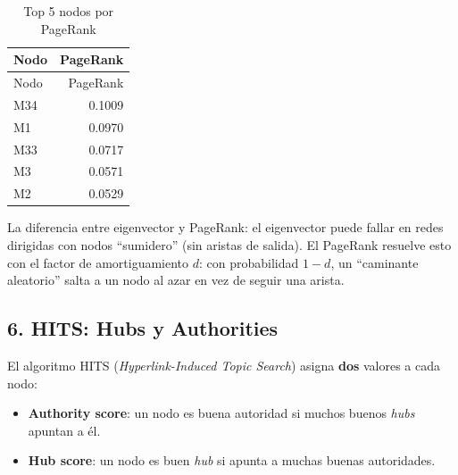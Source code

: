 \documentclass[
  letterpaper,
  DIV=11,
  numbers=noendperiod]{scrreprt}
\providecommand{\tightlist}{%
  \setlength{\itemsep}{0pt}\setlength{\parskip}{0pt}}
\begin{document}
\begin{longtable}[]{@{}lr@{}}
\caption{Top 5 nodos por PageRank}\tabularnewline
\toprule\noalign{}
Nodo & PageRank \\
\midrule\noalign{}
\endfirsthead
\toprule\noalign{}
Nodo & PageRank \\
\midrule\noalign{}
\endhead
\bottomrule\noalign{}
\endlastfoot
M34 & 0.1009 \\
M1 & 0.0970 \\
M33 & 0.0717 \\
M3 & 0.0571 \\
M2 & 0.0529 \\
\end{longtable}

\begin{tcolorbox}[enhanced jigsaw, toprule=.15mm, colframe=quarto-callout-tip-color-frame, coltitle=black, titlerule=0mm, colback=white, breakable, leftrule=.75mm, arc=.35mm, bottomtitle=1mm, toptitle=1mm, rightrule=.15mm, bottomrule=.15mm, left=2mm, title=\textcolor{quarto-callout-tip-color}{\faLightbulb}\hspace{0.5em}{💡 Concepto clave}, colbacktitle=quarto-callout-tip-color!10!white, opacityback=0, opacitybacktitle=0.6]

La diferencia entre eigenvector y PageRank: el eigenvector puede fallar
en redes dirigidas con nodos ``sumidero'' (sin aristas de salida). El
PageRank resuelve esto con el factor de amortiguamiento \(d\): con
probabilidad \(1 - d\), un ``caminante aleatorio'' salta a un nodo al
azar en vez de seguir una arista.

\end{tcolorbox}

\subsection{6. HITS: Hubs y Authorities}\label{hits-hubs-y-authorities}

El algoritmo HITS (\emph{Hyperlink-Induced Topic Search}) asigna
\textbf{dos} valores a cada nodo:

\begin{itemize}
\tightlist
\item
  \textbf{Authority score}: un nodo es buena autoridad si muchos buenos
  \emph{hubs} apuntan a él.
\item
  \textbf{Hub score}: un nodo es buen \emph{hub} si apunta a muchas
  buenas autoridades.
\end{itemize}
\end{document}
